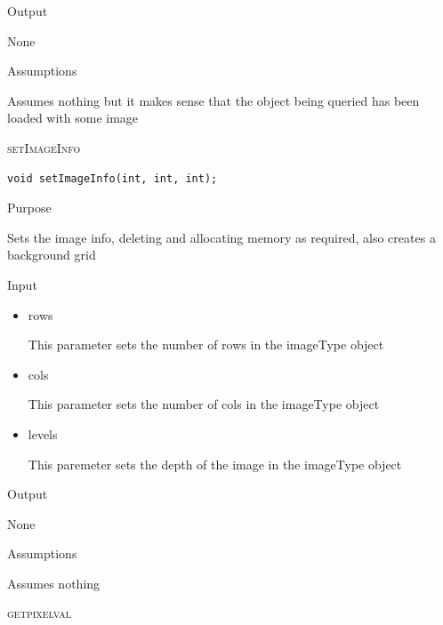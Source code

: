 \documentclass[pdftex, 11pt]{article}
\begin{document}
\begin{description}
\begin{description}
			\item{Output}

				None

			\item{Assumptions}

				Assumes nothing but it makes sense that the object being
				queried has been loaded with some image



		\end{description}


	\item{\textsc{setImageInfo}}
		\begin{description}

\begin{lstlisting}
void setImageInfo(int, int, int);
\end{lstlisting}

			\item{Purpose}
			
				Sets the image info, deleting and allocating memory
				as required, also creates a background grid

			\item{Input}

				\begin{itemize}
					\item{rows}

						This parameter sets the number of rows
						in the imageType object

					\item{cols}

						This parameter sets the number of cols
						in the imageType object

					\item{levels}

						This paremeter sets the depth of the
						image in the imageType object

				\end{itemize}

			\item{Output}

				None

			\item{Assumptions}

				Assumes nothing

		\end{description}




	\item{\textsc{getpixelval}}
		\begin{description}


\end{description}
\end{description}
\end{document}
